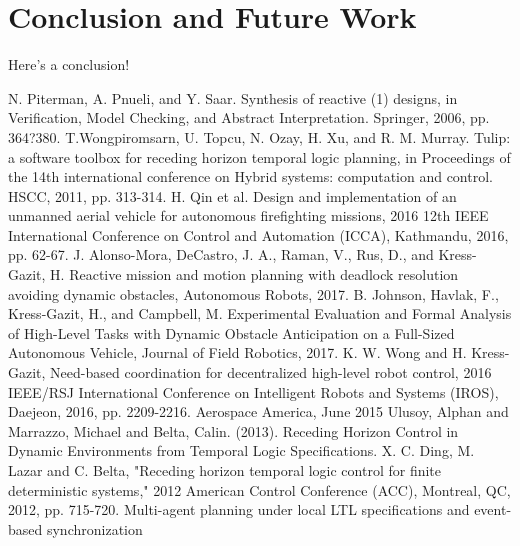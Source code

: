 \documentclass[journal]{IEEEtran}
\begin{document}
\section{Conclusion and Future Work}
Here's a conclusion!
\ifCLASSOPTIONcaptionsoff
  \newpage
\fi
%
%
%
\begin{thebibliography}{1}
N. Piterman, A. Pnueli, and Y. Saar. Synthesis of reactive (1) designs, in Verification, Model Checking, and Abstract Interpretation. Springer, 2006, pp. 364?380.
T.Wongpiromsarn, U. Topcu, N. Ozay, H. Xu, and R. M. Murray. Tulip: a software toolbox for receding horizon temporal logic planning, in Proceedings of the 14th international conference on Hybrid systems: computation and control. HSCC, 2011, pp. 313-314.
H. Qin et al. Design and implementation of an unmanned aerial vehicle for autonomous firefighting missions, 2016 12th IEEE International Conference on Control and Automation (ICCA), Kathmandu, 2016, pp. 62-67.
J. Alonso-Mora, DeCastro, J. A., Raman, V., Rus, D., and Kress-Gazit, H. Reactive mission and motion planning with deadlock resolution avoiding dynamic obstacles, Autonomous Robots, 2017.
B. Johnson, Havlak, F., Kress-Gazit, H., and Campbell, M. Experimental Evaluation and Formal Analysis of High-Level Tasks with Dynamic Obstacle Anticipation on a Full-Sized Autonomous Vehicle, Journal of Field Robotics, 2017.
K. W. Wong and H. Kress-Gazit, Need-based coordination for decentralized high-level robot control, 2016 IEEE/RSJ International Conference on Intelligent Robots and Systems (IROS), Daejeon, 2016, pp. 2209-2216.
Aerospace America, June 2015
Ulusoy, Alphan and Marrazzo, Michael and Belta, Calin. (2013). Receding Horizon Control in Dynamic Environments from Temporal Logic Specifications.
X. C. Ding, M. Lazar and C. Belta, "Receding horizon temporal logic control for finite deterministic systems," 2012 American Control Conference (ACC), Montreal, QC, 2012, pp. 715-720.
Multi-agent planning under local LTL specifications and event-based
synchronization

\end{thebibliography}
\end{document}
